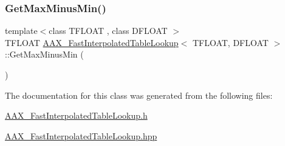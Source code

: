 \subsubsection{\texorpdfstring{GetMaxMinusMin()}{GetMaxMinusMin()}}
{\footnotesize\ttfamily template$<$class T\+F\+L\+O\+AT , class D\+F\+L\+O\+AT $>$ \\
T\+F\+L\+O\+AT \mbox{\hyperlink{a01977}{A\+A\+X\+\_\+\+Fast\+Interpolated\+Table\+Lookup}}$<$ T\+F\+L\+O\+AT, D\+F\+L\+O\+AT $>$\+::Get\+Max\+Minus\+Min (\begin{DoxyParamCaption}{ }\end{DoxyParamCaption})\hspace{0.3cm}{\ttfamily [inline]}}



The documentation for this class was generated from the following files\+:\begin{DoxyCompactItemize}
\item 
\mbox{\hyperlink{a00758}{A\+A\+X\+\_\+\+Fast\+Interpolated\+Table\+Lookup.\+h}}\item 
\mbox{\hyperlink{a00761}{A\+A\+X\+\_\+\+Fast\+Interpolated\+Table\+Lookup.\+hpp}}\end{DoxyCompactItemize}

